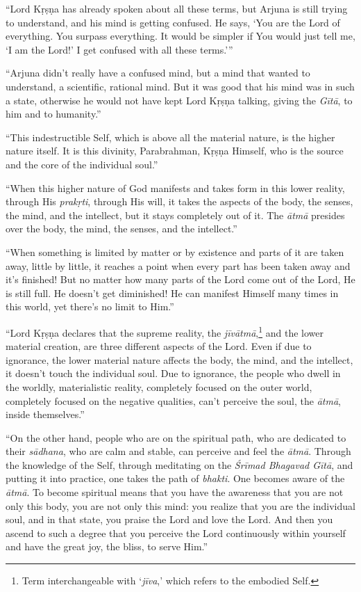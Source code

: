 \enquote{Lord Kṛṣṇa has already spoken about all these terms, but Arjuna is still trying to understand, and his mind is getting confused. He says, \enquote{You are the Lord of everything. You surpass everything. It would be simpler if You would just tell me, ‘I am the Lord!’ I get confused with all these terms.}}

\enquote{Arjuna didn’t really have a confused mind, but a mind that wanted to understand, a scientific, rational mind. But it was good that his mind was in such a state, otherwise he would not have kept Lord Kṛṣṇa talking, giving the \textit{Gītā}, to him and to humanity.}

\enquote{This indestructible Self, which is above all the material nature, is the higher nature itself. It is this divinity, Parabrahman, Kṛṣṇa Himself, who is the source and the core of the individual soul.}

\enquote{When this higher nature of God manifests and takes form in this lower reality, through His \textit{prakṛti}, through His will, it takes the aspects of the body, the senses, the mind, and the intellect, but it stays completely out of it. The \textit{ātmā} presides over the body, the mind, the senses, and the intellect.}

\enquote{When something is limited by matter or by existence and parts of it are taken away, little by little, it reaches a point when every part has been taken away and it’s finished! But no matter how many parts of the Lord come out of the Lord, He is still full. He doesn’t get diminished! He can manifest Himself many times in this world, yet there’s no limit to Him.}

\enquote{Lord Kṛṣṇa declares that the supreme reality, the \textit{jīvātmā},\footnote{Term interchangeable with \enquote{\textit{jīva},} which refers to the embodied Self.} and the lower material creation, are three different aspects of the Lord. Even if due to ignorance, the lower material nature affects the body, the mind, and the intellect, it doesn’t touch the individual soul. Due to ignorance, the people who dwell in the worldly, materialistic reality, completely focused on the outer world, completely focused on the negative qualities, can’t perceive the soul, the \textit{ātmā}, inside themselves.}

\enquote{On the other hand, people who are on the spiritual path, who are dedicated to their \textit{sādhana}, who are calm and stable, can perceive and feel the \textit{ātmā}. Through the knowledge of the Self, through meditating on the \textit{Śrīmad Bhagavad Gītā}, and putting it into practice, one takes the path of \textit{bhakti}. One becomes aware of the \textit{ātmā}. To become spiritual means that you have the awareness that you are not only this body, you are not only this mind: you realize that you are the individual soul, and in that state, you praise the Lord and love the Lord. And then you ascend to such a degree that you perceive the Lord continuously within yourself and have the great joy, the bliss, to serve Him.}

